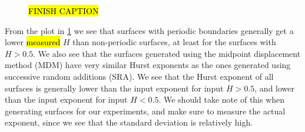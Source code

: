 \begin{figure}[!htb]
{        \hl{FINISH CAPTION} %
        \label{fig:diamond_square_testing}%
    }%
\end{figure}%

From the plot in \cref{fig:diamond_square_testing} we see that surfaces with periodic boundaries generally get a lower \hl{measured} $H$ than non-periodic surfaces, at least for the surfaces with $H>0.5$. We also see that the surfaces generated using the midpoint displacement method (MDM) have very similar Hurst exponents as the ones generated using successive random additions (SRA). We see that the Hurst exponent of all surfaces is generally lower than the input exponent for input $H>0.5$, and lower than the input exponent for input $H<0.5$. We should take note of this when generating surfaces for our experiments, and make sure to measure the actual exponent, since we see that the standard deviation is relatively high.
%
%

